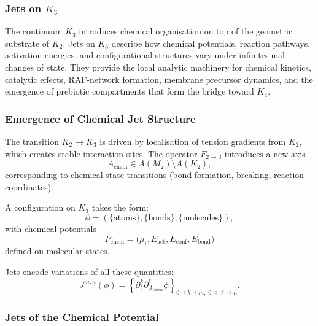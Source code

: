 
\subsubsection{Jets on \texorpdfstring{$K_3$}{K_3}}
\label{sec:jets-k3}

The continuum $K_3$ introduces chemical organisation on top of the
geometric substrate of $K_2$. Jets on $K_3$ describe how chemical
potentials, reaction pathways, activation energies, and configurational
structures vary under infinitesimal changes of state. They provide the
local analytic machinery for chemical kinetics, catalytic effects,
RAF-network formation, membrane precursor dynamics, and the emergence of
prebiotic compartments that form the bridge toward $K_4$.



\subsubsection{Emergence of Chemical Jet Structure}

The transition $K_2 \to K_3$ is driven by localisation of tension
gradients from $K_2$, which creates stable interaction sites. The
operator $F_{2\to3}$ introduces a new axis
\[
A_{\mathrm{chem}} \in A(M_2)\setminus A(K_2),
\]
corresponding to chemical state transitions (bond formation, breaking,
reaction coordinates).

A configuration on $K_3$ takes the form:
\[
\phi = (\{\text{atoms}\},\{\text{bonds}\},\{\text{molecules}\}),
\]
with chemical potentials
\[
P_{\mathrm{chem}} = \bigl(\mu_i, E_{\mathrm{act}}, E_{\mathrm{conf}}, E_{\mathrm{bond}}\bigr)
\]
defined on molecular states.

Jets encode variations of all these quantities:
\[
J^{m,n}(\phi) =
\left\{
\partial_t^k \partial_{A_{\mathrm{chem}}}^{\ell} \phi
\right\}_{0\le k\le m,\; 0\le\ell\le n}.
\]



\subsubsection{Jets of the Chemical Potential}

